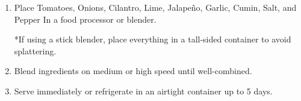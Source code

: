\begin{enumerate}
  \item Place Tomatoes, Onions, Cilantro, Lime, Jalapeño, Garlic, Cumin, Salt, and Pepper In a food
    processor or blender.

    *If using a stick blender, place everything in a tall-sided container to avoid splattering.
  \item Blend ingredients on medium or high speed until well-combined.
  \item Serve immediately or refrigerate in an airtight container up to 5 days.
\end{enumerate}
